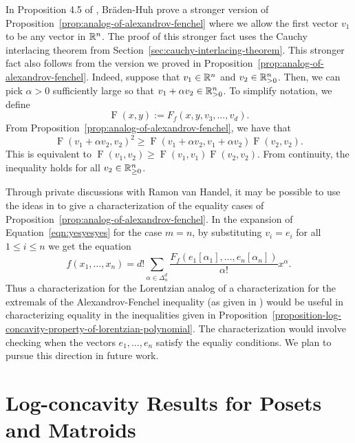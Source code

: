 \documentclass{puthesis-UG}
\begin{document}
\begin{remark}
	In Proposition 4.5 of \cite{lorentzian-polynomials}, Br\"aden-Huh prove a stronger version of Proposition~\ref{prop:analog-of-alexandrov-fenchel} where we allow the first vector $v_1$ to be any vector in $\mathbb{R}^n$. The proof of this stronger fact uses the Cauchy interlacing theorem from Section~\ref{sec:cauchy-interlacing-theorem}. This stronger fact also follows from the version we proved in Proposition~\ref{prop:analog-of-alexandrov-fenchel}. Indeed, suppose that $v_1 \in \mathbb{R}^n$ and $v_2 \in \mathbb{R}_{> 0}^n$. Then, we can pick $\alpha > 0$ sufficiently large so that $v_1 + \alpha v_2 \in \mathbb{R}_{> 0}^n$. To simplify notation, we define 
	\[
		\operatorname{F}(x, y) := F_f(x, y, v_3, \ldots, v_d).
	\]
	From Proposition~\ref{prop:analog-of-alexandrov-fenchel}, we have that
	\[
		\operatorname{F}(v_1 + \alpha v_2, v_2)^2 \geq \operatorname{F}(v_1 + \alpha v_2, v_1 + \alpha v_2) \operatorname{F}(v_2, v_2).
	\]
	This is equivalent to $\operatorname{F}(v_1, v_2) \geq \operatorname{F}(v_1, v_1) \operatorname{F}(v_2, v_2)$. From continuity, the inequality holds for all $v_2 \in \mathbb{R}_{\geq 0}^n$. 
\end{remark}
\begin{remark}
	Through private discussions with Ramon van Handel, it may be possible to use the ideas in \cite{shenfeld2022extremals} to give a characterization of the equality cases of Proposition~\ref{prop:analog-of-alexandrov-fenchel}. In the expansion of Equation~\ref{eqn:yesyesyes} for the case $m = n$, by substituting $v_i = e_i$ for all $1 \leq i \leq n$ we get the equation
	\[
		f(x_1, \ldots, x_n) = d! \sum_{\alpha \in \Delta_n^d} \frac{F_f(e_1 [\alpha_1], \ldots, e_n [\alpha_n])}{\alpha!} x^\alpha.
	\]
	Thus a characterization for the Lorentzian analog of a characterization for the extremals of the Alexandrov-Fenchel inequality (as given in \cite{shenfeld2022extremals}) would be useful in characterizing equality in the inequalities given in Proposition~\ref{proposition-log-concavity-property-of-lorentzian-polynomial}. The characterization would involve checking when the vectors $e_1, \ldots, e_n$ satisfy the equaliy conditions. We plan to pursue this direction in future work.
\end{remark}

\chapter{Log-concavity Results for Posets and Matroids} \label{log-concavity-results}
\end{document}
